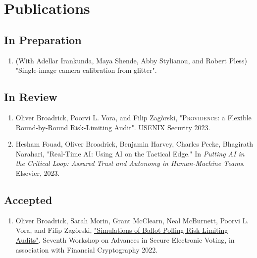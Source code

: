 \documentclass[letterpaper]{article}
\begin{document}
\section*{Publications}

\subsection*{In Preparation}
\begin{enumerate}
\item
(With Adellar Irankunda, Maya Shende, Abby Stylianou, and Robert Pless) "Single-image camera calibration from glitter".
\end{enumerate}

\subsection*{In Review}
\begin{enumerate}
\item
Oliver Broadrick, Poorvi L. Vora, and Filip Zag\`{o}rski, "\textsc{Providence}: a Flexible Round-by-Round Risk-Limiting Audit". USENIX Security 2023.
\item
Hesham Fouad, Oliver Broadrick, Benjamin Harvey, Charles Peeke, Bhagirath Narahari, "Real-Time AI: Using AI on the Tactical Edge." In \emph{Putting AI in the Critical Loop: Assured Trust and Autonomy in Human-Machine Teams}. Elsevier, 2023.
\end{enumerate}

\subsection*{Accepted}
\begin{enumerate}
\item Oliver Broadrick, Sarah Morin, Grant McClearn, Neal McBurnett, Poorvi L. Vora, and Filip Zag\`{o}rski, \href{https://oliverbroadrick.com/papers/simulations-of-ballot-polling-rlas.pdf}{"Simulations of Ballot Polling Risk-Limiting Audits"}. Seventh Workshop on Advances in Secure Electronic Voting, in association with Financial Cryptography 2022.
\end{enumerate}

\bigskip
\end{document}
